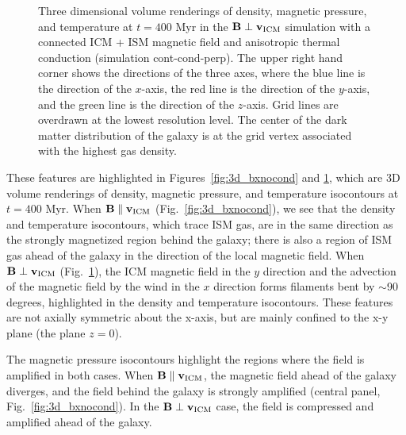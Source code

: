 \documentclass[twocolumn]{aastex6}
\begin{document}
\begin{figure*}[!htbp]
  \begin{center}
     \caption{Three dimensional volume renderings of density, magnetic pressure, and temperature at $t = 400$ Myr in the $\mathbf{B} \perp \mathbf{v_{\rm ICM}}$ simulation with a connected ICM + ISM magnetic field and anisotropic thermal conduction (simulation cont-cond-perp). The upper right hand corner shows the directions of the three axes, where the blue line is the direction of the $x$-axis, the red line is the direction of the $y$-axis, and the green line is the direction of the $z$-axis. Grid lines are overdrawn at the lowest resolution level. The center of the dark matter distribution of the galaxy is at the grid vertex associated with the highest gas density.       
      \label{fig:3d_bynocond}}
  \end{center}  
\end{figure*}

These features are highlighted in Figures~\ref{fig:3d_bxnocond} and \ref{fig:3d_bynocond}, which are 3D volume renderings of density, magnetic pressure, and temperature isocontours at $t = 400$ Myr. When $\mathbf{B} \parallel \mathbf{v_{\rm ICM}}$  (Fig.~\ref{fig:3d_bxnocond}), we see that the density and temperature isocontours, which trace ISM gas, are in the same direction as the strongly magnetized region behind the galaxy; there is also a region of ISM gas ahead of the galaxy in the direction of the local magnetic field. When $\mathbf{B} \perp \mathbf{v_{\rm ICM}}$  (Fig.~\ref{fig:3d_bynocond}), the ICM magnetic field in the $y$ direction and the advection of the magnetic field by the wind in the $x$ direction  forms filaments bent by $\sim$90 degrees, highlighted in the density and temperature isocontours. These features are not axially symmetric about the x-axis, but are mainly confined to the x-y plane (the plane $z = 0$).

The magnetic pressure isocontours highlight the regions where the field is amplified in both cases. When $\mathbf{B} \parallel \mathbf{v_{\rm ICM}}$, the magnetic field ahead of the galaxy diverges, and the field behind the galaxy is strongly amplified (central panel, Fig.~\ref{fig:3d_bxnocond}). In the $\mathbf{B} \perp \mathbf{v_{\rm ICM}}$  case, the field is compressed and amplified ahead of the galaxy.
\end{document}
